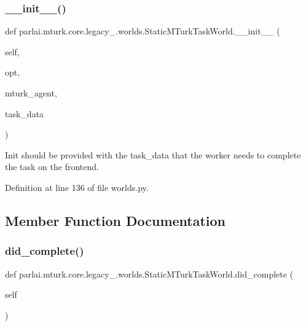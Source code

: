 \subsubsection{\texorpdfstring{\+\_\+\+\_\+init\+\_\+\+\_\+()}{\_\_init\_\_()}}
{\footnotesize\ttfamily def parlai.\+mturk.\+core.\+legacy\+\_.\+worlds.\+Static\+M\+Turk\+Task\+World.\+\_\+\+\_\+init\+\_\+\+\_\+ (\begin{DoxyParamCaption}\item[{}]{self,  }\item[{}]{opt,  }\item[{}]{mturk\+\_\+agent,  }\item[{}]{task\+\_\+data }\end{DoxyParamCaption})}

\begin{DoxyVerb}Init should be provided with the task_data that the worker needs
to complete the task on the frontend.
\end{DoxyVerb}
 

Definition at line 136 of file worlds.\+py.



\subsection{Member Function Documentation}
\mbox{\label{classparlai_1_1mturk_1_1core_1_1legacy__2018_1_1worlds_1_1StaticMTurkTaskWorld_af07d98eed07ddf1be2fa16310b4bf405}} 
\subsubsection{\texorpdfstring{did\+\_\+complete()}{did\_complete()}}
{\footnotesize\ttfamily def parlai.\+mturk.\+core.\+legacy\+\_.\+worlds.\+Static\+M\+Turk\+Task\+World.\+did\+\_\+complete (\begin{DoxyParamCaption}\item[{}]{self }\end{DoxyParamCaption})}

